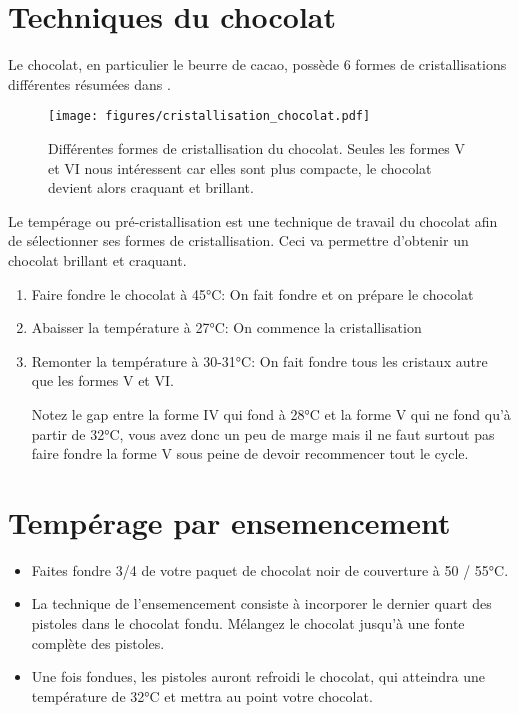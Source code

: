 \documentclass[a4paper,twoside,openright]{report}
\begin{document}
\newpage
\section{Techniques du chocolat}
Le chocolat, en particulier le beurre de cacao, possède 6 formes de cristallisations différentes résumées dans .

\begin{figure}[htb]
\centering
\texttt{[image: figures/cristallisation\_chocolat.pdf]}
\caption{Différentes formes de cristallisation du chocolat. Seules les formes V et VI nous intéressent car elles sont plus compacte, le chocolat devient alors craquant et brillant.}\label{fig:cristallisation_chocolat}
\end{figure}

Le tempérage ou pré-cristallisation est une technique de travail du chocolat afin de sélectionner ses formes de cristallisation. Ceci va permettre d'obtenir un chocolat brillant et craquant.

\begin{enumerate}
 \item Faire fondre le chocolat à 45°C: On fait fondre et on prépare le chocolat
 \item Abaisser la température à 27°C: On commence la cristallisation
 \item Remonter la température à 30-31°C: On fait fondre tous les cristaux autre que les formes V et VI. 
 \begin{attention}
Notez le gap entre la forme IV qui fond à 28°C et la forme V qui ne fond qu'à partir de 32°C, vous avez donc un peu de marge mais il ne faut surtout pas faire fondre la forme V sous peine de devoir recommencer tout le cycle.
 \end{attention}

\end{enumerate}

\section{Tempérage par ensemencement}

\begin{itemize}
\item Faites fondre 3/4 de votre paquet de chocolat noir de couverture à 50 / 55°C.
\item La technique de l'ensemencement consiste à incorporer le dernier quart des pistoles dans le chocolat fondu. Mélangez le chocolat jusqu'à une fonte complète des pistoles.
\item Une fois fondues, les pistoles auront refroidi le chocolat, qui atteindra une température de 32°C et mettra au point votre chocolat.
\end{itemize}
\end{document}
